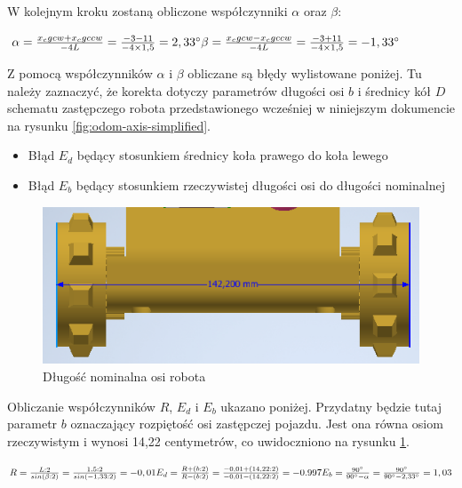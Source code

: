 W kolejnym kroku zostaną obliczone współczynniki $\alpha$ oraz $\beta$:

\begin{center}
    $
    \alpha = \frac{x_cgcw + x_cgccw}{-4L} = \frac{-3 - 11}{-4 \times 1,5} = 2,33^{\circ} \\[5pt] 
    \beta = \frac{x_cgcw - x_cgccw}{-4L} = \frac{-3 + 11}{-4 \times 1,5} = -1,33^{\circ}
    $
\end{center}

Z pomocą współczynników $\alpha$ i $\beta$ obliczane są błędy wylistowane poniżej. Tu należy zaznaczyć, że korekta dotyczy parametrów długości osi $b$ i średnicy kół $D$ schematu zastępczego robota przedstawionego wcześniej w niniejszym dokumencie na rysunku \ref{fig:odom-axis-simplified}.

\begin{itemize}
    \item Błąd $E_{d}$ będący stosunkiem średnicy koła prawego do koła lewego
    \item Błąd $E_{b}$ będący stosunkiem rzeczywistej długości osi do długości nominalnej
\end{itemize}

\begin{figure}[ht]
	\centering
		\includegraphics[width=0.6\linewidth]{rys/axis-b-param.PNG}
	\caption{Długość nominalna osi robota}
    \label{fig:nominal-axis-width}
\end{figure}


Obliczanie współczynników $R$, $E_{d}$ i $E_{b}$ ukazano poniżej. Przydatny będzie tutaj parametr $b$ oznaczający rozpiętość osi zastępczej pojazdu. Jest ona równa osiom rzeczywistym i wynosi 14,22 centymetrów, co uwidoczniono na rysunku \ref{fig:nominal-axis-width}.

\begin{center}
    $
    R = \frac{L : 2}{sin(\beta : 2)} = \frac{1,5 : 2}{sin(-1,33 : 2)} = -0,01 \\[5pt]
    E_{d} = \frac{R + (b : 2)}{R - (b : 2)} = \frac{-0,01 + (14,22 : 2)}{-0,01 - (14,22 : 2)} = -0.997 \\[5pt]
    E_{b} = \frac{90^{\circ}}{90^{\circ} - \alpha} = \frac{90^{\circ}}{90^{\circ} - 2,33^{\circ}} = 1,03
    $
\end{center}


